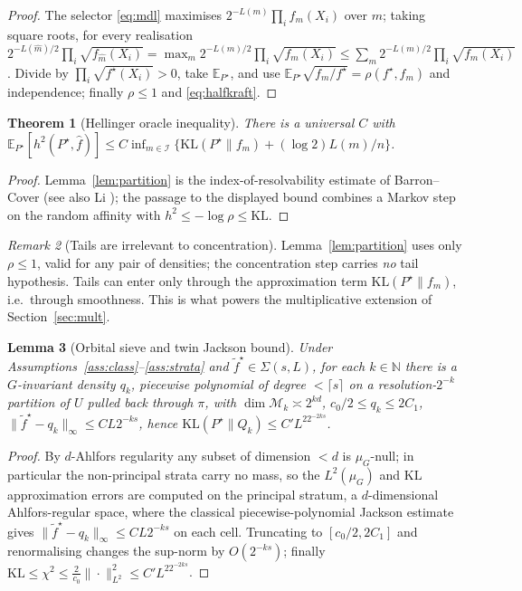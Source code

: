\documentclass[11pt]{article}
\theoremstyle{plain}
\newtheorem{theorem}{Theorem}[section]
\newtheorem{lemma}[theorem]{Lemma}
\theoremstyle{definition}
\theoremstyle{remark}
\newtheorem{remark}[theorem]{Remark}
\newcommand{\N}{\mathbb{N}}
\newcommand{\E}{\mathbb{E}}
\newcommand{\KL}{\mathrm{KL}}
\DeclareMathOperator{\dimm}{dim}
\begin{document}
\begin{proof}
The selector \eqref{eq:mdl} maximises $2^{-L(m)}\prod_i f_m(X_i)$ over $m$; taking
square roots, for every realisation
$2^{-L(\widehat m)/2}\prod_i\sqrt{f_{\widehat m}(X_i)}=\max_m2^{-L(m)/2}\prod_i\sqrt{f_m(X_i)}\le\sum_m2^{-L(m)/2}\prod_i\sqrt{f_m(X_i)}$.
Divide by $\prod_i\sqrt{f^\star(X_i)}>0$, take $\E_{P^\star}$, and use
$\E_{P^\star}\sqrt{f_m/f^\star}=\rho(f^\star,f_m)$ and independence; finally
$\rho\le1$ and \eqref{eq:halfkraft}.
\end{proof}

\begin{theorem}[Hellinger oracle inequality]\label{thm:oracle}
There is a universal $C$ with
$\E_{P^\star}[h^2(P^\star,\widehat f)]\le C\inf_{m\in\mathcal I}\{\KL(P^\star\|f_m)+(\log2)L(m)/n\}$.
\end{theorem}

\begin{proof}
Lemma~\ref{lem:partition} is the index-of-resolvability estimate of Barron--Cover
\cite{barroncover} (see also Li \cite{li}); the passage to the displayed bound
combines a Markov step on the random affinity with $h^2\le-\log\rho\le\KL$.
\end{proof}

\begin{remark}[Tails are irrelevant to concentration]\label{rem:tailfree}
Lemma~\ref{lem:partition} uses only $\rho\le1$, valid for any pair of densities;
the concentration step carries \emph{no} tail hypothesis. Tails can enter only
through the approximation term $\KL(P^\star\|f_m)$, i.e.\ through smoothness. This
is what powers the multiplicative extension of Section~\ref{sec:mult}.
\end{remark}

\begin{lemma}[Orbital sieve and twin Jackson bound]\label{lem:jackson}
Under Assumptions~\ref{ass:class}--\ref{ass:strata} and $\tilde f^\star\in\Sigma(s,L)$, for each
$k\in\N$ there is a $G$-invariant density $q_k$, piecewise polynomial of degree
$<\lceil s\rceil$ on a resolution-$2^{-k}$ partition of $U$ pulled back through
$\pi$, with $\dimm\mathcal M_k\asymp2^{kd}$, $c_0/2\le q_k\le2C_1$,
$\|\tilde f^\star-q_k\|_\infty\le CL2^{-ks}$, hence
$\KL(P^\star\|Q_k)\le C'L^22^{-2ks}$.
\end{lemma}

\begin{proof}
By $d$-Ahlfors regularity any subset of dimension $<d$ is $\mu_G$-null; in
particular the non-principal strata carry no mass, so the $L^2(\mu_G)$ and $\KL$
approximation errors are computed on the principal stratum, a $d$-dimensional
Ahlfors-regular space, where the classical piecewise-polynomial Jackson estimate
gives $\|\tilde f^\star-q_k\|_\infty\le CL2^{-ks}$ on each cell. Truncating to
$[c_0/2,2C_1]$ and renormalising changes the sup-norm by $O(2^{-ks})$; finally
$\KL\le\chi^2\le\tfrac2{c_0}\|\cdot\|_{L^2}^2\le C'L^22^{-2ks}$.
\end{proof}
\end{document}
